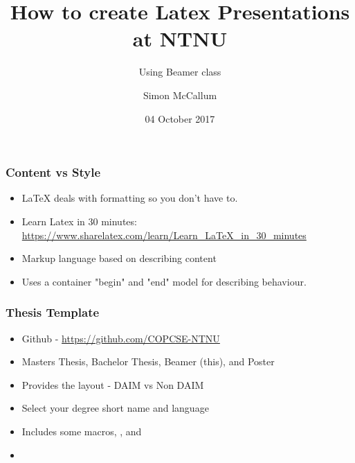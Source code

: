 \documentclass[screen, aspectratio=43]{beamer}
\title[Latex Presentations]{How to create Latex Presentations at NTNU}
\subtitle{Using Beamer class}
\author[S. McCallum]{Simon McCallum}
\institute[NTNU]{Department of Computer Sciences, NTNU}
\date{04 October 2017}
\begin{document}
\begin{frame}
  \titlepage
\end{frame}


\begin{frame}
  \frametitle{Content vs Style}
  \begin{itemize}
      \item {\LaTeX} deals with formatting so you don't have to.
      \item Learn Latex in 30 minutes: \url{https://www.sharelatex.com/learn/Learn_LaTeX_in_30_minutes}
      \item Markup language based on describing content
      \item Uses a container "begin" and "end" model for describing behaviour.
      
  \end{itemize}
\end{frame}

\begin{frame}
  \frametitle{Thesis Template}
  \begin{itemize}
      \item Github - \url{https://github.com/COPCSE-NTNU}
      \item Masters Thesis, Bachelor Thesis, Beamer (this), and Poster
      \item Provides the layout - DAIM vs Non DAIM
      \item Select your degree short name and language
      \item Includes some macros, \detokenize{\CPP}, \detokenize{\todo} and \detokenize{\com}
      \item 
  \end{itemize}

\end{frame}
\end{document}
